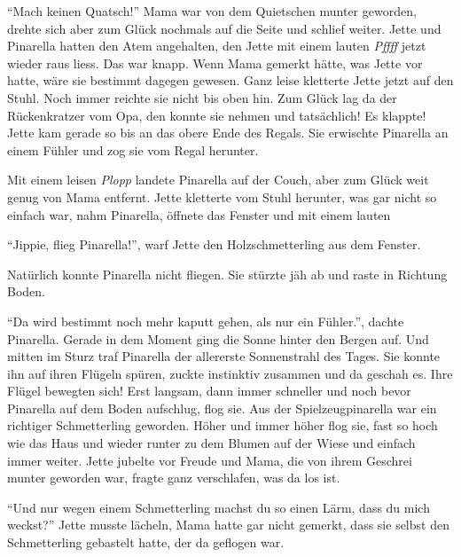 \enquote{Mach keinen Quatsch!} Mama war von dem Quietschen munter geworden, drehte sich aber zum Glück nochmals auf die Seite und schlief weiter. Jette und Pinarella hatten den Atem angehalten, den Jette mit einem lauten {\itshape Pffff} jetzt wieder raus liess. Das war knapp. Wenn Mama gemerkt hätte, was Jette vor hatte, wäre sie bestimmt dagegen gewesen. Ganz leise kletterte Jette jetzt auf den Stuhl. Noch immer reichte sie nicht bis oben hin. Zum Glück lag da der Rückenkratzer vom Opa, den konnte sie nehmen und tatsächlich! Es klappte! Jette kam gerade so bis an das obere Ende des Regals. Sie erwischte Pinarella an einem Fühler und zog sie vom Regal herunter. 

Mit einem leisen {\itshape Plopp} landete Pinarella auf der Couch, aber zum Glück weit genug von Mama entfernt. Jette kletterte vom Stuhl herunter, was gar nicht so einfach war, nahm Pinarella, öffnete das Fenster und mit einem lauten 

\enquote{Jippie, flieg Pinarella!}, warf Jette den Holzschmetterling aus dem Fenster.

Natürlich konnte Pinarella nicht fliegen. Sie stürzte jäh ab und raste in Richtung Boden. 

\enquote{Da wird bestimmt noch mehr kaputt gehen, als nur ein Fühler.}, dachte Pinarella. Gerade in dem Moment ging die Sonne hinter den Bergen auf. Und mitten im Sturz traf Pinarella der allererste Sonnenstrahl des Tages. Sie konnte ihn auf ihren Flügeln spüren, zuckte instinktiv zusammen und da geschah es. Ihre Flügel bewegten sich! Erst langsam, dann immer schneller und noch bevor Pinarella auf dem Boden aufschlug, flog sie. Aus der Spielzeugpinarella war ein richtiger Schmetterling geworden. Höher und immer höher flog sie, fast so hoch wie das Haus und wieder runter zu dem Blumen auf der Wiese und einfach immer weiter. Jette jubelte vor Freude und Mama, die von ihrem Geschrei munter geworden war, fragte ganz verschlafen, was da los ist.

\enquote{Und nur wegen einem Schmetterling machst du so einen Lärm, dass du mich weckst?} Jette musste lächeln, Mama hatte gar nicht gemerkt, dass sie selbst den Schmetterling gebastelt hatte, der da geflogen war.\hfill {\color{DeepPink}\decofourleft}
